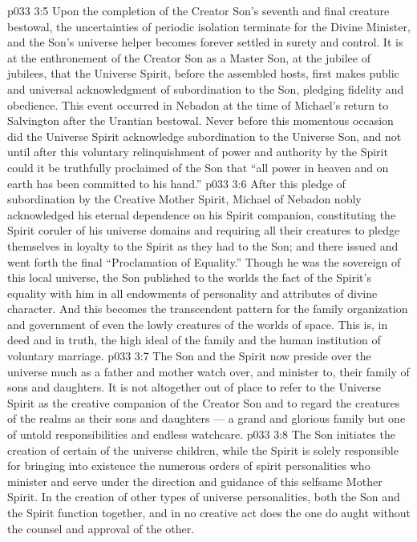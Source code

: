 \vs p033 3:5 Upon the completion of the Creator Son’s seventh and final creature bestowal, the uncertainties of periodic isolation terminate for the Divine Minister, and the Son’s universe helper becomes forever settled in surety and control. It is at the enthronement of the Creator Son as a Master Son, at the jubilee of jubilees, that the Universe Spirit, before the assembled hosts, first makes public and universal acknowledgment of subordination to the Son, pledging fidelity and obedience. This event occurred in Nebadon at the time of Michael’s return to Salvington after the Urantian bestowal. Never before this momentous occasion did the Universe Spirit acknowledge subordination to the Universe Son, and not until after this voluntary relinquishment of power and authority by the Spirit could it be truthfully proclaimed of the Son that “all power in heaven and on earth has been committed to his hand.”
\vs p033 3:6 After this pledge of subordination by the Creative Mother Spirit, Michael of Nebadon nobly acknowledged his eternal dependence on his Spirit companion, constituting the Spirit coruler of his universe domains and requiring all their creatures to pledge themselves in loyalty to the Spirit as they had to the Son; and there issued and went forth the final “Proclamation of Equality.” Though he was the sovereign of this local universe, the Son published to the worlds the fact of the Spirit’s equality with him in all endowments of personality and attributes of divine character. And this becomes the transcendent pattern for the family organization and government of even the lowly creatures of the worlds of space. This is, in deed and in truth, the high ideal of the family and the human institution of voluntary marriage.
\vs p033 3:7 The Son and the Spirit now preside over the universe much as a father and mother watch over, and minister to, their family of sons and daughters. It is not altogether out of place to refer to the Universe Spirit as the creative companion of the Creator Son and to regard the creatures of the realms as their sons and daughters --- a grand and glorious family but one of untold responsibilities and endless watchcare.
\vs p033 3:8 \pc The Son initiates the creation of certain of the universe children, while the Spirit is solely responsible for bringing into existence the numerous orders of spirit personalities who minister and serve under the direction and guidance of this selfsame Mother Spirit. In the creation of other types of universe personalities, both the Son and the Spirit function together, and in no creative act does the one do aught without the counsel and approval of the other.
